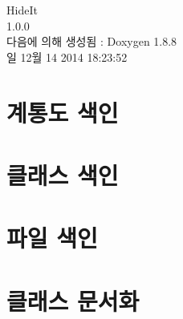 \documentclass[twoside]{book}
\newcommand{\+}{\discretionary{\mbox{\scriptsize$\hookleftarrow$}}{}{}}
\newcommand{\clearemptydoublepage}{%
  \newpage{\pagestyle{empty}\cleardoublepage}%
}
\begin{document}
\hypersetup{pageanchor=false,
             bookmarks=true,
             bookmarksnumbered=true,
             pdfencoding=unicode
            }
\begin{titlepage}
\vspace*{7cm}
\begin{center}%
{\Large Hide\+It \\[1ex]\large 1.\+0.\+0 }\\
\vspace*{1cm}
{\large 다음에 의해 생성됨 \+:  Doxygen 1.8.8}\\
\vspace*{0.5cm}
{\small 일 12월 14 2014 18:23:52}\\
\end{center}
\end{titlepage}
\clearemptydoublepage
\tableofcontents
\clearemptydoublepage
{}
\hypersetup{pageanchor=true}

\chapter{계통도 색인}

\chapter{클래스 색인}

\chapter{파일 색인}

\chapter{클래스 문서화}



































\end{document}
